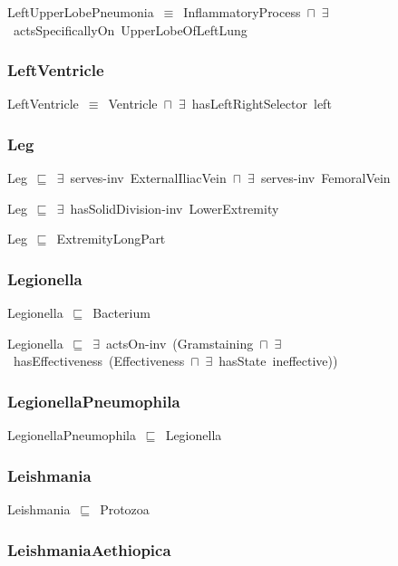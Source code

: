 \documentclass{article}
\begin{document}
LeftUpperLobePneumonia~\ensuremath{\equiv}~InflammatoryProcess~\ensuremath{\sqcap}~\ensuremath{\exists}~actsSpecificallyOn~UpperLobeOfLeftLung

\subsubsection*{LeftVentricle}

LeftVentricle~\ensuremath{\equiv}~Ventricle~\ensuremath{\sqcap}~\ensuremath{\exists}~hasLeftRightSelector~left

\subsubsection*{Leg}

Leg~\ensuremath{\sqsubseteq}~\ensuremath{\exists}~serves-inv~ExternalIliacVein~\ensuremath{\sqcap}~\ensuremath{\exists}~serves-inv~FemoralVein~

Leg~\ensuremath{\sqsubseteq}~\ensuremath{\exists}~hasSolidDivision-inv~LowerExtremity~

Leg~\ensuremath{\sqsubseteq}~ExtremityLongPart~

\subsubsection*{Legionella}

Legionella~\ensuremath{\sqsubseteq}~Bacterium~

Legionella~\ensuremath{\sqsubseteq}~\ensuremath{\exists}~actsOn-inv~(Gramstaining~\ensuremath{\sqcap}~\ensuremath{\exists}~hasEffectiveness~(Effectiveness~\ensuremath{\sqcap}~\ensuremath{\exists}~hasState~ineffective))~

\subsubsection*{LegionellaPneumophila}

LegionellaPneumophila~\ensuremath{\sqsubseteq}~Legionella~

\subsubsection*{Leishmania}

Leishmania~\ensuremath{\sqsubseteq}~Protozoa~

\subsubsection*{LeishmaniaAethiopica}
\end{document}
